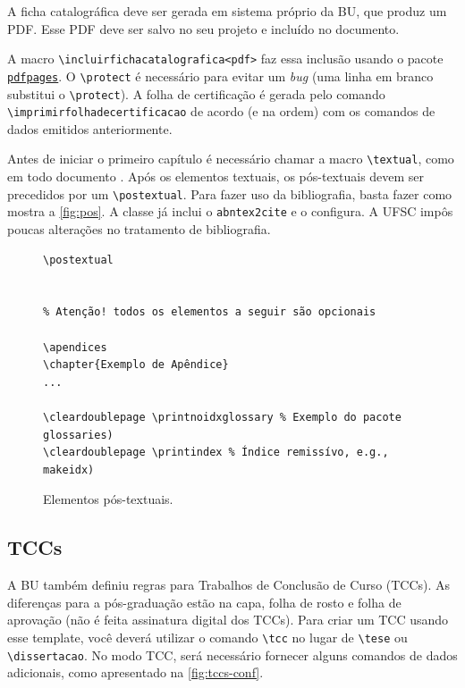 \documentclass[embeddedlogo]{../ufsc-thesis-rn46-2019}
\newcommand{\lacmd}[1]{\texttt{\textbackslash{}#1}}
\begin{document}
A ficha catalográfica deve ser gerada em sistema próprio da BU, que produz um
PDF. Esse PDF deve ser salvo no seu projeto e incluído no documento.

A macro \lacmd{incluirfichacatalografica{<pdf>}} faz essa inclusão usando o
pacote \href{https://www.ctan.org/pkg/pdfpages}{\texttt{pdfpages}}. O
\lacmd{protect} é necessário para evitar um \emph{bug} (uma linha em branco
substitui o \lacmd{protect}).  A folha de certificação é gerada pelo comando
\lacmd{imprimirfolhadecertificacao} de acordo (e na ordem) com os comandos de
dados emitidos anteriormente.

Antes de iniciar o primeiro capítulo é necessário chamar a macro
\lacmd{textual}, como em todo documento \abnTeX. Após os elementos textuais, os
pós-textuais devem ser precedidos por um \lacmd{postextual}. Para fazer uso da
bibliografia, basta fazer como mostra a \autoref{fig:pos}. A classe já inclui o
\texttt{abntex2cite} e o configura. A UFSC impôs poucas alterações no tratamento
de bibliografia.

\begin{figure}[tb]
  \centering
  \caption{Elementos pós-textuais.}
  \label{fig:pos}
  \begin{verbatim}
\postextual


% Atenção! todos os elementos a seguir são opcionais

\apendices
\chapter{Exemplo de Apêndice}
...

\cleardoublepage \printnoidxglossary % Exemplo do pacote glossaries)
\cleardoublepage \printindex % Índice remissívo, e.g., makeidx)
  \end{verbatim}
\end{figure}

\subsection{TCCs}
\label{sec:tcc}

A BU também definiu regras para Trabalhos de Conclusão de Curso (TCCs). As
diferenças para a pós-graduação estão na capa, folha de rosto e folha de
aprovação (não é feita assinatura digital dos TCCs). Para criar um TCC usando
esse template, você deverá utilizar o comando \lacmd{tcc} no lugar de
\lacmd{tese} ou \lacmd{dissertacao}. No modo TCC, será necessário fornecer
alguns comandos de dados adicionais, como apresentado na
\autoref{fig:tccs-conf}.
\end{document}
